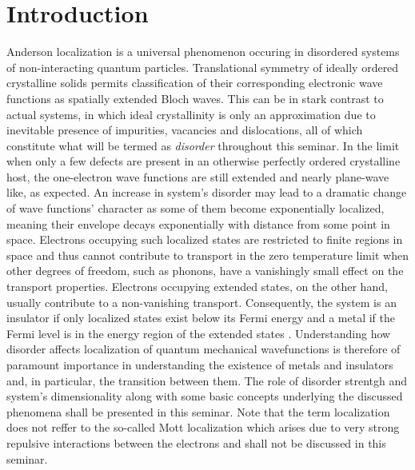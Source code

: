 \documentclass[10pt,a4paper]{article}
\begin{document}
\section{Introduction}
Anderson localization is a universal phenomenon occuring in disordered systems of non-interacting quantum particles. Translational symmetry of ideally ordered crystalline solids permits classification of their corresponding electronic wave functions as spatially extended Bloch waves. This can be in stark contrast to actual systems, in which ideal crystallinity is only an approximation due to inevitable presence of impurities, vacancies and dislocations, all of which constitute what will be termed as \emph{disorder} throughout this seminar. In the limit when only a few defects are present in an otherwise perfectly ordered crystalline host, the one-electron wave functions are still extended and nearly plane-wave like, as expected. An increase in system's disorder may lead to a dramatic change of wave functions' character as some of them become exponentially localized, meaning their envelope decays exponentially with distance from some point in space. Electrons occupying such localized states are restricted to finite regions in space and thus cannot contribute to transport in the zero temperature limit when other degrees of freedom, such as phonons, have a vanishingly small effect on the transport properties. Electrons 
occupying extended states, on the other hand, usually contribute to a non-vanishing transport. Consequently, the system is an insulator if only localized states exist below its Fermi energy and a metal if the Fermi level is in the energy region of the extended states \cite{Kramer}. Understanding how disorder affects localization of quantum mechanical wavefunctions is therefore of paramount importance in understanding the existence of metals and insulators and, in particular, the transition between them. The role of disorder strentgh and system's dimensionality along with some basic concepts underlying the discussed phenomena shall be presented in this seminar. Note that the term localization does not reffer to the so-called Mott localization which arises  due to very strong repulsive interactions between the electrons and shall not be discussed in this seminar.
\end{document}
